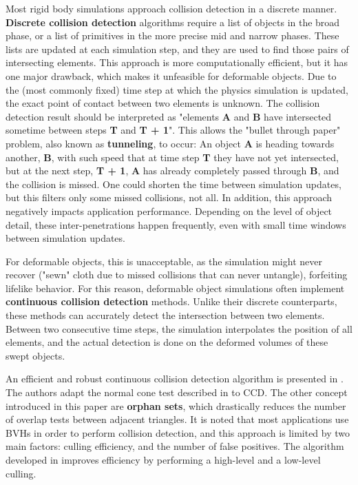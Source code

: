 Most rigid body simulations approach collision detection in a discrete manner. \textbf{Discrete collision detection} algorithms require a list of objects in the broad phase, or a list of primitives in the more precise mid and narrow phases. These lists are updated at each simulation step, and they are used to find those pairs of intersecting elements. This approach is more computationally efficient, but it has one major drawback, which makes it unfeasible for deformable objects. Due to the (most commonly fixed) time step at which the physics simulation is updated, the exact point of contact between two elements is unknown. The collision detection result should be interpreted as "elements \textbf{A} and \textbf{B} have intersected sometime between steps \textbf{T} and \textbf{T + 1}". This allows the "bullet through paper" problem, also known as \textbf{tunneling}, to occur: An object \textbf{A} is heading towards another, \textbf{B}, with such speed that at time step \textbf{T} they have not yet intersected, but at the next step, \textbf{T + 1}, \textbf{A} has already completely passed through \textbf{B}, and the collision is missed. One could shorten the time between simulation updates, but this filters only some missed collisions, not all. In addition, this approach negatively impacts application performance. Depending on the level of object detail, these inter-penetrations happen frequently, even with small time windows between simulation updates.

For deformable objects, this is unacceptable, as the simulation might never recover ("sewn" cloth due to missed collisions that can never untangle), forfeiting lifelike behavior. For this reason, deformable object simulations often implement \textbf{continuous collision detection} methods. Unlike their discrete counterparts, these methods can accurately detect the intersection between two elements. Between two consecutive time steps, the simulation interpolates the position of all elements, and the actual detection is done on the deformed volumes of these swept objects.

An efficient and robust continuous collision detection algorithm is presented in \citep{tang08}. The authors adapt the normal cone test described in \citep{provot97} to CCD. The other concept introduced in this paper are \textbf{orphan sets}, which drastically reduces the number of overlap tests between adjacent triangles. It is noted that most applications use BVHs in order to perform collision detection, and this approach is limited by two main factors: culling efficiency, and the number of false positives. The algorithm developed in \citep{tang08} improves efficiency by performing a high-level and a low-level culling.

